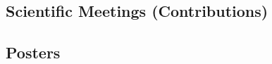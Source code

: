 \documentclass[11pt,letterpaper,pdf]{article}
\newcommand{\mycon}[1]{\smallskip\begin{enumerate}[resume,label={\scriptsize \arabic*$\ $},leftmargin=\parindent]\setlength{\itemsep}{#1}\vspace*{-0.7em}}
\newcommand{\ee}{\end{enumerate}}
\newcommand{\talk}[4]{%
  \item #1. (#2) {\it #3} (#4).}
\begin{document}


\subsection*{Scientific Meetings (Contributions)}


%
%
%
%
%
%
%
%


\subsection*{Posters}

\end{document}
